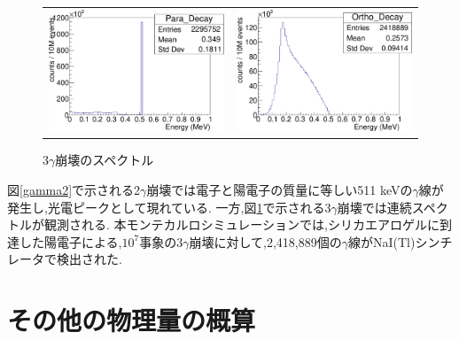 \begin{figure}[!tbp]
	\begin{tabular}{cc}

	\centering
		\begin{minipage}{0.5\hsize}
		\includegraphics[width=7cm]{fig/gamma2.pdf}
	\caption[$2\gamma$崩壊のスペクトル]{$2\gamma$崩壊のスペクトル}
	\label{gamma2}
		\end{minipage}&

		\begin{minipage}{0.5\hsize}
	\centering
		\includegraphics[width=7cm]{fig/gamma3.pdf}
	\caption[$3\gamma$崩壊のスペクトル]{$3\gamma$崩壊のスペクトル}
	\label{gamma3}
		\end{minipage}

		\end{tabular}
\end{figure}

図\ref{gamma2}で示される2$\gamma$崩壊では電子と陽電子の質量に等しい511 keVの$\gamma$線が発生し,光電ピークとして現れている.
一方,図\ref{gamma3}で示される$3\gamma$崩壊では連続スペクトルが観測される.
本モンテカルロシミュレーションでは,シリカエアロゲルに到達した陽電子による,$10^7$事象の$3\gamma$崩壊に対して,2,418,889個の$\gamma$線がNaI(Tl)シンチレータで検出された.


\section{その他の物理量の概算}
\label{section_other}

